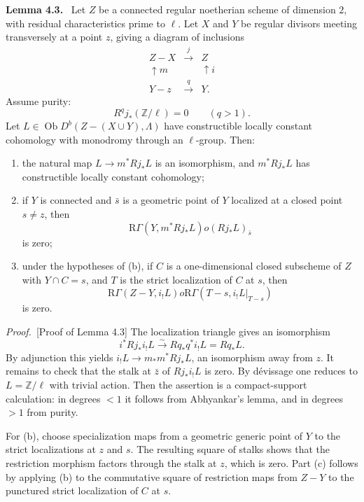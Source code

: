 \documentclass[11pt]{article}
\theoremstyle{plain}
\theoremstyle{definition}
\theoremstyle{remark}
\newenvironment{statement}[1]{\par\medskip\noindent\textbf{#1.}\ }{\par\medskip}
\newenvironment{prooftext}{\par\noindent\textit{Proof.}\ }{\par\medskip}
\newcommand{\ZZ}{\mathbb Z}
\DeclareMathOperator{\ob}{Ob}
\newcommand{\R}{\mathrm R}
\begin{document}
\begin{statement}{Lemma 4.3}
Let $Z$ be a connected regular noetherian scheme of dimension $2$, with residual characteristics prime to $\ell$. Let $X$ and $Y$ be regular divisors meeting transversely at a point $z$, giving a diagram of inclusions
\[
\begin{array}{ccccc}
Z-X & \xrightarrow{j} & Z\\
\uparrow m & & \uparrow i\\
Y-z & \xrightarrow{q} & Y.
\end{array}
\]
Assume purity:
\[
   R^qj_*(\ZZ/\ell)=0\qquad(q>1).
\]
Let $L\in\ob D^b(Z-(X\cup Y),\Lambda)$ have constructible locally constant cohomology with monodromy through an $\ell$-group. Then:
\begin{enumerate}[label=(\alph*)]
\item the natural map $L\to m^*Rj_*L$ is an isomorphism, and $m^*Rj_*L$ has constructible locally constant cohomology;
\item if $Y$ is connected and $\bar s$ is a geometric point of $Y$ localized at a closed point $s\ne z$, then
\[
   \R\Gamma(Y,m^*Rj_*L)	o (Rj_*L)_{\bar s}
\]
is zero;
\item under the hypotheses of (b), if $C$ is a one-dimensional closed subscheme of $Z$ with $Y\cap C=s$, and $T$ is the strict localization of $C$ at $s$, then
\[
   \R\Gamma(Z-Y,i_!L)	o \R\Gamma(T-s,i_!L|_{T-s})
\]
is zero.
\end{enumerate}
\end{statement}

\begin{prooftext}[Proof of Lemma 4.3]
The localization triangle gives an isomorphism
\[
   i^*Rj_*i_!L\xrightarrow{\sim}Rq_*q^*i_!L=Rq_*L.
\]
By adjunction this yields $i_!L\to m_*m^*Rj_*L$, an isomorphism away from $z$. It remains to check that the stalk at $\bar z$ of $Rj_*i_!L$ is zero. By dévissage one reduces to $L=\ZZ/\ell$ with trivial action. Then the assertion is a compact-support calculation: in degrees $<1$ it follows from Abhyankar's lemma, and in degrees $>1$ from purity.

For (b), choose specialization maps from a geometric generic point of $Y$ to the strict localizations at $z$ and $s$. The resulting square of stalks shows that the restriction morphism factors through the stalk at $z$, which is zero. Part (c) follows by applying (b) to the commutative square of restriction maps from $Z-Y$ to the punctured strict localization of $C$ at $s$.
\end{prooftext}
\end{document}
